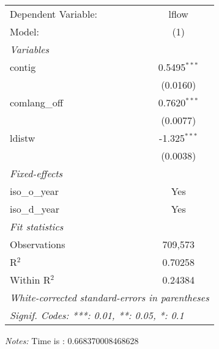 \begin{tabular}{lc}
\tabularnewline\toprule\toprule
Dependent Variable:&lflow\\
Model:&(1)\\
\midrule
\emph{Variables}&  \\
contig&0.5495$^{***}$\\
  &(0.0160)\\
comlang\_off&0.7620$^{***}$\\
  &(0.0077)\\
ldistw&-1.325$^{***}$\\
  &(0.0038)\\
\midrule
\emph{Fixed-effects}&  \\
iso\_o\_year&Yes\\
iso\_d\_year&Yes\\
\midrule
\emph{Fit statistics}&  \\
Observations& 709,573\\
R$^2$ & 0.70258\\
Within R$^2$ & 0.24384\\
\bottomrule\bottomrule
\multicolumn{2}{l}{\emph{White-corrected standard-errors in parentheses}}\\
\multicolumn{2}{l}{\emph{Signif. Codes: ***: 0.01, **: 0.05, *: 0.1}}\\
\end{tabular}

\emph{\medskip Notes:} Time is : 0.668370008468628
